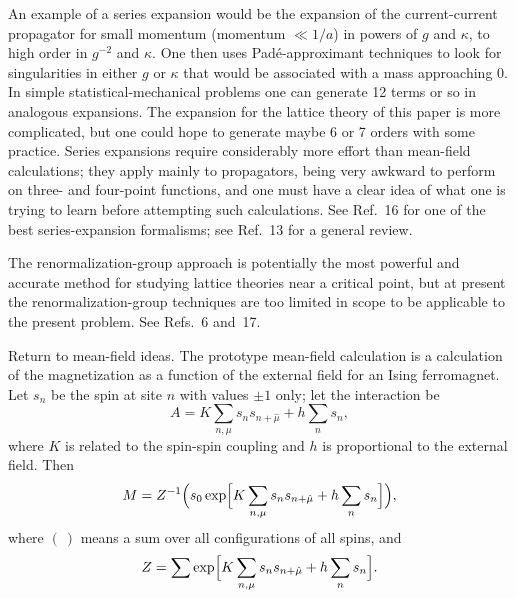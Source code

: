 An example of a series expansion would be the expansion of the
current-current propagator for small momentum (momentum $\ll 1/a$) in
powers of $g$ and $\kappa$, to high order in $g^{-2}$ and $\kappa$.  One
then uses Pad\'e-approximant techniques to look for singularities in
either $g$ or $\kappa$ that would be associated with a mass approaching
0.  In simple statistical-mechanical problems one can generate 12 terms
or so in analogous expansions.  The expansion for the lattice theory of
this paper is more complicated, but one could hope to generate maybe 6
or 7 orders with some practice.  Series expansions require considerably
more effort than mean-field calculations; they apply mainly to
propagators, being very awkward to perform on three- and four-point
functions, and one must have a clear idea of what one is trying to learn
before attempting such calculations.  See Ref.~16 for one of the best
series-expansion formalisms; see Ref.~13 for a general review.

The renormalization-group approach is potentially the most powerful and
accurate method for studying lattice theories near a critical point, but
at present the renormalization-group techniques are too limited in scope
to be applicable to the present problem.  See Refs.~6 and~17.

Return to mean-field ideas.  The prototype mean-field calculation is a
calculation of the magnetization as a function of the external field for
an Ising ferromagnet.  Let $s_{n}$ be the spin at site $n$ with values
$\pm 1$ only; let the interaction be
\begin{equation}
A = K\sum_{n,\mu}s_{n}s_{n+\hat\mu} + h\sum_{n}s_{n},
\label{eq:6.1}
\end{equation}
where $K$ is related to the spin-spin coupling and $h$ is proportional
to the external field.  Then
\begin{equation}
M = Z^{-1}\Bigl(s_{0}\exp\Bigl[K\sum_{n,\mu}s_{n}s_{n+\hat\mu}
    + h\sum_{n}s_{n}\Bigr]\Bigr),
\label{eq:6.2}
\end{equation}
where $(\ )$ means a sum over all configurations of all spins, and
\begin{equation}
Z = \sum\exp\Bigl[K\sum_{n,\mu}s_{n}s_{n+\hat\mu}
    + h\sum_{n}s_{n}\Bigr].
\label{eq:6.3}
\end{equation}

